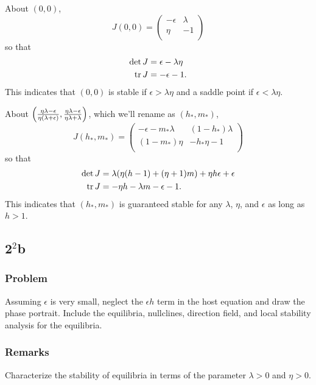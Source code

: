 \documentclass[12pt]{article}
\begin{document}
About $(0,0)$,
\begin{equation*}
  J(0,0) =
  \begin{pmatrix}
    -\epsilon & \lambda \\
    \eta & -1 \\
  \end{pmatrix}
\end{equation*}
so that
\begin{equation*}
  \begin{aligned}
    \det{J} &= \epsilon-\lambda\eta \\
    \operatorname{tr}{J} &= -\epsilon-1. \\
  \end{aligned}
\end{equation*}
This indicates that $(0,0)$ is stable if $\epsilon>\lambda\eta$ and a saddle
point if $\epsilon<\lambda\eta$.

About $\left(\frac{\eta\lambda-\epsilon}{\eta(\lambda+\epsilon)}, \frac{\eta\lambda-\epsilon}{\eta\lambda+\lambda}\right)$, which we'll rename as
$(h_*,m_*)$,
\begin{equation*}
  J(h_*,m_*) =
  \begin{pmatrix}
    -\epsilon-m_*\lambda & (1-h_*)\lambda \\
    (1-m_*)\eta  & -h_*\eta-1 \\
  \end{pmatrix}
\end{equation*}
so that
\begin{equation*}
  \begin{aligned}
    \det{J} &= \lambda(\eta(h-1)+(\eta+1)m)+\eta h\epsilon+\epsilon \\
    \operatorname{tr}{J} &= -\eta h-\lambda m-\epsilon-1. \\
  \end{aligned}
\end{equation*}
This indicates that $(h_*,m_*)$ is guaranteed stable for any $\lambda$, $\eta$,
and $\epsilon$ as long as $h>1$.

\subsection{2$^2$b}
\subsubsection*{Problem}
Assuming $\epsilon$ is very small, neglect the $\epsilon h$ term in the host equation
and draw the phase portrait. Include the equilibria, nullclines, direction
field, and local stability analysis for the equilibria.

\subsubsection*{Remarks}
Characterize the stability of equilibria in terms of the parameter $\lambda>0$
and $\eta>0$.
\end{document}
